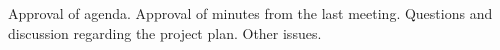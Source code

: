 \nextItem Approval of agenda.
\nextItem Approval of minutes from the last meeting.
\nextItem Questions and discussion regarding the project plan.
\nextItem Other issues.
